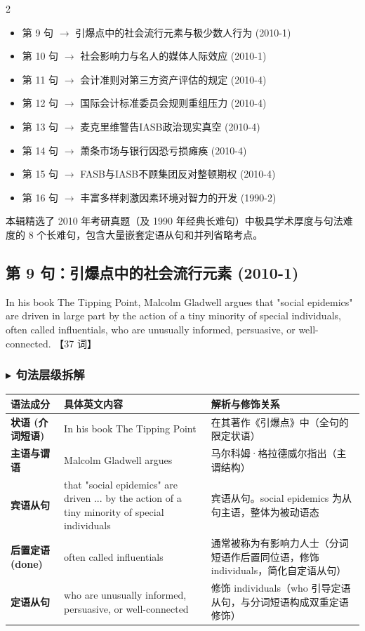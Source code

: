 \documentclass[cn,normal,11pt]{elegantnote}
\newcommand{\introductionname}{内容概要}
\newenvironment{introduction}[1][\introductionname]{
  \begin{tcolorbox}[introductionsty,title={#1}]
    \begin{multicols}{2}
      \begin{itemize}[label=\textcolor{structurecolor}{\SquareShadowBottomRight}]}{
      \end{itemize}
    \end{multicols}
  \end{tcolorbox}}
\begin{document}
\begin{introduction}
  \item 第 9 句 $\rightarrow$ 引爆点中的社会流行元素与极少数人行为 (2010-1)
  \item 第 10 句 $\rightarrow$ 社会影响力与名人的媒体人际效应 (2010-1)
  \item 第 11 句 $\rightarrow$ 会计准则对第三方资产评估的规定 (2010-4)
  \item 第 12 句 $\rightarrow$ 国际会计标准委员会规则重组压力 (2010-4)
  \item 第 13 句 $\rightarrow$ 麦克里维警告IASB政治现实真空 (2010-4)
  \item 第 14 句 $\rightarrow$ 萧条市场与银行因恐亏损瘫痪 (2010-4)
  \item 第 15 句 $\rightarrow$ FASB与IASB不顾集团反对整顿期权 (2010-4)
  \item 第 16 句 $\rightarrow$ 丰富多样刺激因素环境对智力的开发 (1990-2)
\end{introduction}

本辑精选了 2010 年考研真题（及 1990 年经典长难句）中极具学术厚度与句法难度的 8 个长难句，包含大量嵌套定语从句和并列省略考点。

\subsection{第 9 句：引爆点中的社会流行元素 (2010-1)}

\begin{note}
  In his book The Tipping Point, Malcolm Gladwell argues that "social epidemics" are driven in large part by the action of a tiny minority of special individuals, often called influentials, who are unusually informed, persuasive, or well-connected. 【37 词】
\end{note}

\subsubsection*{$\blacktriangleright$ 句法层级拆解}
\noindent
\begin{tabularx}{\textwidth}{p{3.2cm} X X}
  \toprule
  \textbf{语法成分} & \textbf{具体英文内容} & \textbf{解析与修饰关系} \\
  \midrule
  \textbf{状语 (介词短语)} & In his book The Tipping Point & 在其著作《引爆点》中（全句的限定状语） \\
  \midrule
  \textbf{主语与谓语} & Malcolm Gladwell argues & 马尔科姆·格拉德威尔指出（主谓结构） \\
  \midrule
  \textbf{宾语从句} & that "social epidemics" are driven ... by the action of a tiny minority of special individuals & 宾语从句。social epidemics 为从句主语，整体为被动语态 \\
  \midrule
  \textbf{后置定语 (done)} & often called influentials & 通常被称为有影响力人士（分词短语作后置同位语，修饰 individuals，简化自定语从句） \\
  \midrule
  \textbf{定语从句} & who are unusually informed, persuasive, or well-connected & 修饰 individuals（who 引导定语从句，与分词短语构成双重定语修饰） \\
  \bottomrule
\end{tabularx}
\end{document}
